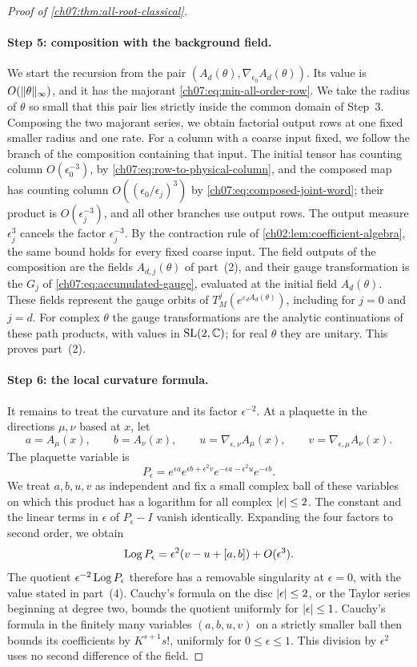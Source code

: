\begin{proof}[Proof of \cref{ch07:thm:all-root-classical}]
\paragraph{Step 5: composition with the background field.}
We start the recursion from the pair $(A_d(\theta),\nabla_{\epsilon_0}A_d(\theta))$. Its value is $O(\lVert \theta\rVert_\infty)$, and it has the majorant \eqref{ch07:eq:min-all-order-row}. We take the radius of $\theta$ so small that this pair lies strictly inside the common domain of Step~3. Composing the two majorant series, we obtain factorial output rows at one fixed smaller radius and one rate. For a column with a coarse input fixed, we follow the branch of the composition containing that input. The initial tensor has counting column $O(\epsilon_0^{-3})$, by \eqref{ch07:eq:row-to-physical-column}, and the composed map has counting column $O((\epsilon_0/\epsilon_j)^3)$ by \eqref{ch07:eq:composed-joint-word}; their product is $O(\epsilon_j^{-3})$, and all other branches use output rows. The output measure $\epsilon_j^3$ cancels the factor $\epsilon_j^{-3}$. By the contraction rule of \cref{ch02:lem:coefficient-algebra}, the same bound holds for every fixed coarse input. The field outputs of the composition are the fields $A_{d,j}(\theta)$ of part~(2), and their gauge transformation is the $G_j$ of \eqref{ch07:eq:accumulated-gauge}, evaluated at the initial field $A_d(\theta)$. These fields represent the gauge orbits of $T_M^j(e^{\varepsilon_dA_d(\theta)})$, including for $j=0$ and $j=d$. For complex $\theta$ the gauge transformations are the analytic continuations of these path products, with values in $\mathrm{SL}(2,\mathbb C)$; for real $\theta$ they are unitary. This proves part~(2).

\paragraph{Step 6: the local curvature formula.}
It remains to treat the curvature and its factor $\epsilon^{-2}$. At a plaquette in the directions $\mu,\nu$ based at $x$, let
\[
 a=A_\mu(x),\qquad b=A_\nu(x),\qquad u=\nabla_{\epsilon,\nu}A_\mu(x),\qquad v=\nabla_{\epsilon,\mu}A_\nu(x).
\]
The plaquette variable is
\[
 P_\epsilon=e^{\epsilon a}e^{\epsilon b+\epsilon^2v}e^{-\epsilon a-\epsilon^2u}e^{-\epsilon b}.
\]
We treat $a,b,u,v$ as independent and fix a small complex ball of these variables on which this product has a logarithm for all complex $\lvert \epsilon\rvert\le2$. The constant and the linear terms in $\epsilon$ of $P_\epsilon-I$ vanish identically. Expanding the four factors to second order, we obtain
\[
 \operatorname{Log} P_\epsilon=\epsilon^2(v-u+[a,b])+O(\epsilon^3).
\]
The quotient $\epsilon^{-2}\operatorname{Log} P_\epsilon$ therefore has a removable singularity at $\epsilon=0$, with the value stated in part~(4). Cauchy's formula on the disc $\lvert \epsilon\rvert\le2$, or the Taylor series beginning at degree two, bounds the quotient uniformly for $\lvert \epsilon\rvert\le1$. Cauchy's formula in the finitely many variables $(a,b,u,v)$ on a strictly smaller ball then bounds its coefficients by $K^{s+1}s!$, uniformly for $0\le\epsilon\le1$. This division by $\epsilon^2$ uses no second difference of the field.


\end{proof}
